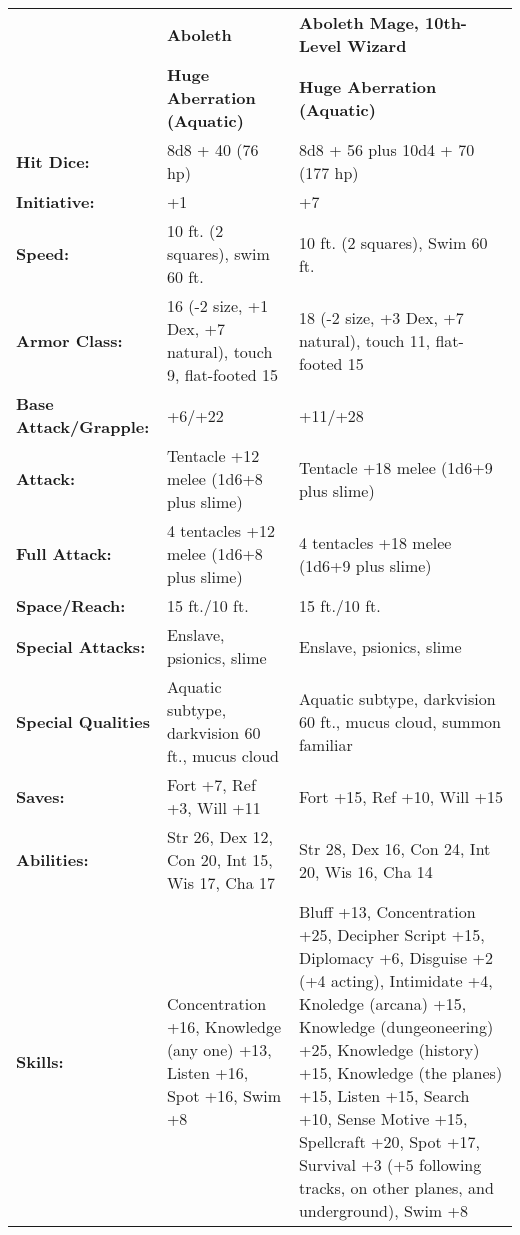 \documentclass[../main.tex]{subfiles}
\begin{document}
\begin{table}[]
\centering
\begin{tabular}{p{9em}p{16em}p{20em}}
 & \textbf{Aboleth} & \textbf{Aboleth Mage, 10th-Level Wizard} \\
 & \textbf{Huge Aberration (Aquatic)} & \textbf{Huge Aberration (Aquatic)} \\
\rowcolor[HTML]{FFCE93}
\textbf{Hit Dice:} & 8d8 + 40 (76 hp) & 8d8 + 56 plus 10d4 + 70 (177 hp) \\
\textbf{Initiative:} & +1 & +7 \\
\rowcolor[HTML]{FFCE93}
\textbf{Speed:} & 10 ft. (2 squares), swim 60 ft. & 10 ft. (2 squares), Swim 60 ft. \\
\textbf{Armor Class:} & 16 (-2 size, +1 Dex, +7 natural), touch 9, flat-footed 15 & 18 (-2 size, +3 Dex, +7 natural), touch 11, flat-footed 15 \\
\rowcolor[HTML]{FFCE93}
\textbf{Base Attack/Grapple:} & +6/+22 & +11/+28 \\
\textbf{Attack:} & Tentacle +12 melee (1d6+8 plus slime) & Tentacle +18 melee (1d6+9 plus slime) \\
\rowcolor[HTML]{FFCE93}
\textbf{Full Attack:} & 4 tentacles +12 melee (1d6+8 plus slime) & 4 tentacles +18 melee (1d6+9 plus slime) \\
\textbf{Space/Reach:} & 15 ft./10 ft. & 15 ft./10 ft. \\
\rowcolor[HTML]{FFCE93}
\textbf{Special Attacks:} & Enslave, psionics, slime & Enslave, psionics, slime \\
\textbf{Special Qualities} & Aquatic subtype, darkvision 60 ft., mucus cloud & Aquatic subtype, darkvision 60 ft., mucus cloud, summon familiar \\
\rowcolor[HTML]{FFCE93}
\textbf{Saves:} & Fort +7, Ref +3, Will +11 & Fort +15, Ref +10, Will +15 \\
\textbf{Abilities:} & Str 26, Dex 12, Con 20, Int 15, Wis 17, Cha 17 & Str 28, Dex 16, Con 24, Int 20, Wis 16, Cha 14 \\
\rowcolor[HTML]{FFCE93}
\textbf{Skills:} & Concentration +16, Knowledge (any one) +13, Listen +16, Spot +16, Swim +8 & Bluff +13, Concentration +25, Decipher Script +15, Diplomacy +6, Disguise +2 (+4 acting), Intimidate +4, Knoledge (arcana) +15, Knowledge (dungeoneering) +25, Knowledge (history) +15, Knowledge (the planes) +15, Listen +15, Search +10, Sense Motive +15, Spellcraft +20, Spot +17, Survival +3 (+5 following tracks, on other planes, and underground), Swim +8 \\

\end{tabular}
\end{table}
\end{document}
